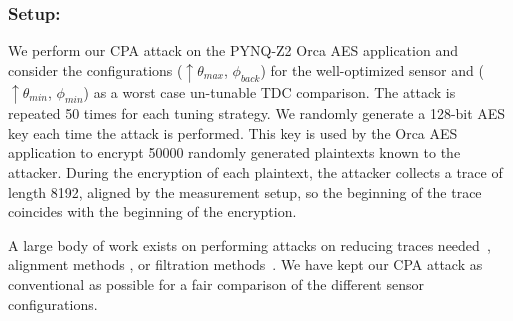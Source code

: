 

\subsubsection*{\textbf{Setup:}}
We perform our CPA attack on the PYNQ-Z2 Orca AES application and consider the configurations ($\uparrow\theta_{max}$, $\phi_{back}$) for the well-optimized sensor and ($\uparrow\theta_{min}$, $\phi_{min}$) as a worst case un-tunable TDC comparison. The attack is repeated 50 times for each tuning strategy. We randomly generate a 128-bit AES key each time the attack is performed. This key is used by the Orca AES application to encrypt 50000 randomly generated plaintexts known to the attacker. During the encryption of each plaintext, the attacker collects a trace of length 8192, aligned by the measurement setup, so the beginning of the trace coincides with the beginning of the encryption. 

A large body of work exists on performing attacks on reducing traces needed~\cite{clavier14_practical}, alignment methods \cite{oswald2011breaking, van2011improving, gebotys2005analysis, plos2008evaluation}, or filtration methods~\cite{oswald13_side, ronen17_iot}. We have kept our CPA attack as conventional as possible for a fair comparison of the different sensor configurations.

